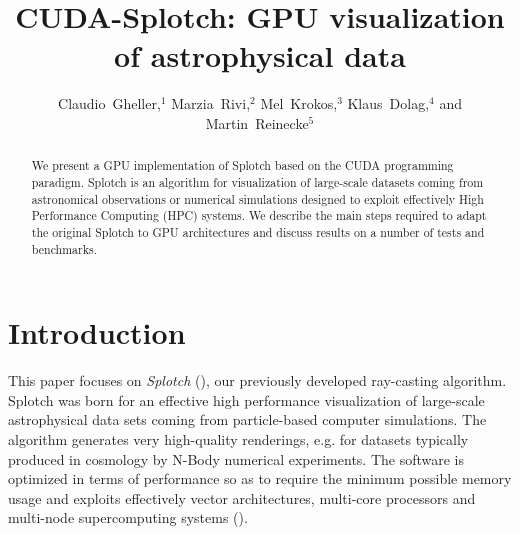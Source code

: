 
\resetcounters




\title{CUDA-Splotch: GPU visualization of astrophysical data}
\author{Claudio~Gheller,$^1$ Marzia~Rivi,$^2$ Mel~Krokos,$^3$ Klaus~Dolag,$^4$ and Martin~Reinecke$^5$
}


\begin{abstract}

We present a GPU implementation of Splotch based on the CUDA programming paradigm. Splotch is an algorithm for visualization of large-scale datasets coming from astronomical observations or numerical simulations designed to exploit effectively High Performance Computing (HPC) systems.
We describe the main steps required to adapt the original Splotch to GPU architectures and discuss results on a number of tests and benchmarks.

\end{abstract}

\section{Introduction}

This paper focuses on {\it Splotch} (\citet{2008NJPh...10l5006D}), 
our previously developed ray-casting
algorithm. Splotch was born for an effective high performance visualization of large-scale
astrophysical data sets coming from particle-based computer simulations. 
The algorithm generates very high-quality renderings, e.g. for datasets typically produced in cosmology by N-Body numerical experiments.
The software is optimized in terms of performance so as to require the minimum possible
memory usage and exploits effectively vector architectures, multi-core processors
and multi-node supercomputing systems (\citet{jin:high-performance}).

